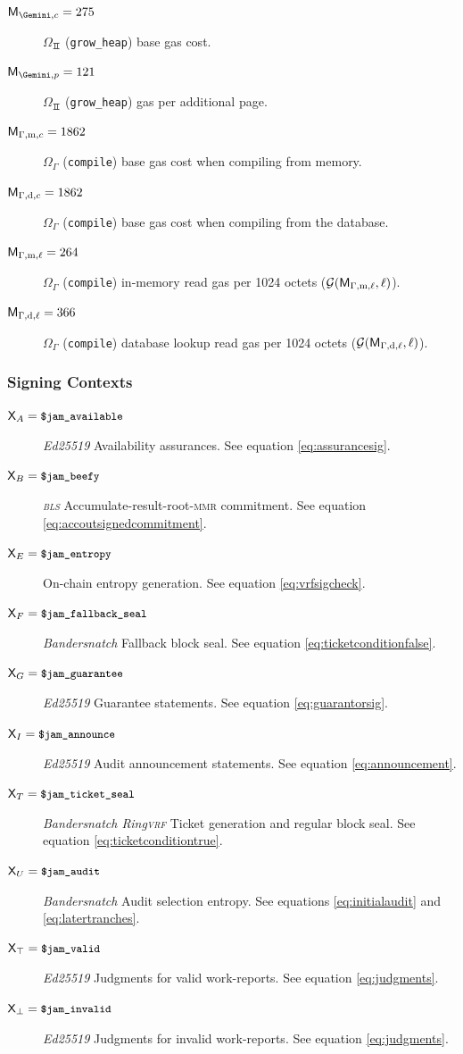 \begin{description}
  \item[$\CgasGeminiconst = 275$] $\Omega_\Gemini$ (\texttt{grow\_heap}) base gas cost.
  \item[$\CgasGeminilinear = 121$] $\Omega_\Gemini$ (\texttt{grow\_heap}) gas per additional page.
  \item[$\mathsf{M}_{\Gamma,\mathrm{m},c} = 1862$] $\Omega_\Gamma$ (\texttt{compile}) base gas cost when compiling from memory.
  \item[$\mathsf{M}_{\Gamma,\mathrm{d},c} = 1862$] $\Omega_\Gamma$ (\texttt{compile}) base gas cost when compiling from the database.
  \item[$\mathsf{M}_{\Gamma,\mathrm{m},\ell} = 264$] $\Omega_\Gamma$ (\texttt{compile}) in-memory read gas per 1024 octets ($\mathcal{G}(\mathsf{M}_{\Gamma,\mathrm{m},\ell}, \ell)$).
  \item[$\mathsf{M}_{\Gamma,\mathrm{d},\ell} = 366$] $\Omega_\Gamma$ (\texttt{compile}) database lookup read gas per 1024 octets ($\mathcal{G}(\mathsf{M}_{\Gamma,\mathrm{d},\ell}, \ell)$).
\end{description}

\subsubsection{Signing Contexts}

\begin{description}
  \item[$\mathsf{X}_A = \text{{\small \texttt{\$jam\_available}}}$] \emph{Ed25519} Availability assurances. See equation \ref{eq:assurancesig}.
  \item[$\mathsf{X}_B = \text{{\small \texttt{\$jam\_beefy}}}$] \emph{\textsc{bls}} Accumulate-result-root-\textsc{mmr} commitment. See equation \ref{eq:accoutsignedcommitment}.
  \item[$\mathsf{X}_E = \text{{\small \texttt{\$jam\_entropy}}}$] On-chain entropy generation. See equation \ref{eq:vrfsigcheck}.
  \item[$\mathsf{X}_F = \text{{\small \texttt{\$jam\_fallback\_seal}}}$] \emph{Bandersnatch} Fallback block seal. See equation \ref{eq:ticketconditionfalse}.
  \item[$\mathsf{X}_G = \text{{\small \texttt{\$jam\_guarantee}}}$] \emph{Ed25519} Guarantee statements. See equation \ref{eq:guarantorsig}.
  \item[$\mathsf{X}_I = \text{{\small \texttt{\$jam\_announce}}}$] \emph{Ed25519} Audit announcement statements. See equation \ref{eq:announcement}.
  \item[$\mathsf{X}_T = \text{{\small \texttt{\$jam\_ticket\_seal}}}$] \emph{Bandersnatch Ring\textsc{vrf}} Ticket generation and regular block seal. See equation \ref{eq:ticketconditiontrue}.
  \item[$\mathsf{X}_U = \text{{\small \texttt{\$jam\_audit}}}$] \emph{Bandersnatch} Audit selection entropy. See equations \ref{eq:initialaudit} and \ref{eq:latertranches}.
  \item[$\mathsf{X}_\top = \text{{\small \texttt{\$jam\_valid}}}$] \emph{Ed25519} Judgments for valid work-reports. See equation \ref{eq:judgments}.
  \item[$\mathsf{X}_\bot = \text{{\small \texttt{\$jam\_invalid}}}$] \emph{Ed25519} Judgments for invalid work-reports. See equation \ref{eq:judgments}.
\end{description}
